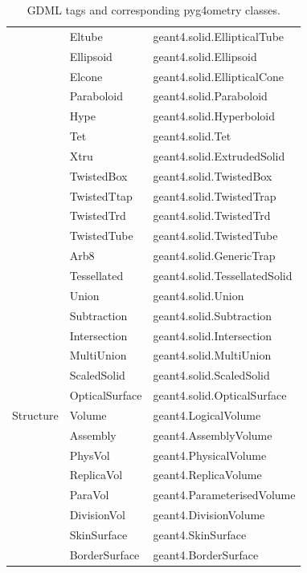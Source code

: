 \documentclass[final,5p,times,twocolumn]{elsarticle}
\begin{document}
\begin{table}[hbt!]
\begin{tabular}{|l|l|l|}
	  			& Eltube					& geant4.solid.EllipticalTube		\\
	  			& Ellipsoid					& geant4.solid.Ellipsoid			\\
	  			& Elcone					& geant4.solid.EllipticalCone		\\
				& Paraboloid				& geant4.solid.Paraboloid			\\
				& Hype					& geant4.solid.Hyperboloid		\\
				& Tet						& geant4.solid.Tet				\\
				& Xtru					& geant4.solid.ExtrudedSolid		\\
				& TwistedBox				& geant4.solid.TwistedBox		\\
				& TwistedTtap				& geant4.solid.TwistedTrap		\\
				& TwistedTrd				& geant4.solid.TwistedTrd 		\\
				& TwistedTube				& geant4.solid.TwistedTube		\\
				& Arb8					& geant4.solid.GenericTrap		\\
				& Tessellated				& geant4.solid.TessellatedSolid 	\\
				& Union					& geant4.solid.Union				\\
				& Subtraction				& geant4.solid.Subtraction			\\
				& Intersection				& geant4.solid.Intersection 		\\
				& MultiUnion				& geant4.solid.MultiUnion 			\\
				& ScaledSolid				& geant4.solid.ScaledSolid		\\				
	  			& OpticalSurface			& geant4.solid.OpticalSurface		\\ \hline
Structure			& Volume					& geant4.LogicalVolume			\\
				& Assembly				& geant4.AssemblyVolume 		\\
				& PhysVol					& geant4.PhysicalVolume			\\ 
				& ReplicaVol				& geant4.ReplicaVolume			\\ 
				& ParaVol					& geant4.ParameterisedVolume	\\ 
				& DivisionVol				& geant4.DivisionVolume			\\
				& SkinSurface				& geant4.SkinSurface			\\ 
				& BorderSurface			& geant4.BorderSurface			\\ \hline

\end{tabular}
\caption{GDML tags and corresponding pyg4ometry classes.}
\end{table}
\end{document}
